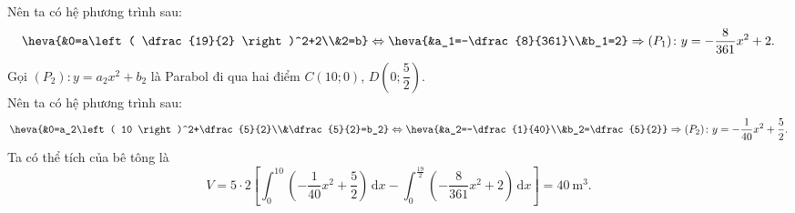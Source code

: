 \begin{bt}
{		Nên ta có hệ phương trình sau: 
		$$\heva{&0=a\left( \dfrac{19}{2} \right)^2+2\\&2=b}
		\Leftrightarrow \heva{&a_1=-\dfrac{8}{361}\\&b_1=2}
		\Rightarrow (P_1)\colon y=-\dfrac{8}{361}{x^2}+2.$$
		Gọi $(P_2)\colon y=a_2x^2+b_2$ là Parabol đi qua hai điểm $C\left( 10;0 \right)$, $D\left( 0;\dfrac{5}{2} \right)$.\\
		Nên ta có hệ phương trình sau: 
		$$\heva{&0=a_2\left( 10 \right)^2+\dfrac{5}{2}\\&\dfrac{5}{2}=b_2}
		\Leftrightarrow \heva{&a_2=-\dfrac{1}{40}\\&b_2=\dfrac{5}{2}}
		\Rightarrow (P_2)\colon y=-\dfrac{1}{40} x^2+\dfrac{5}{2}.$$
		Ta có thể tích của bê tông là 
		$$ V=5\cdot 2\left[ \int_0^{10} \left( -\dfrac{1}{40}{x^2}+\dfrac{5}{2} \right)\mathrm{\,d}x- \int_0^{\tfrac{19}{2}} \left( -\dfrac{8}{361}{x^2}+2 \right)\mathrm{\,d}x \right]
		=40~\text{m}^3.$$
	}
\end{bt}

